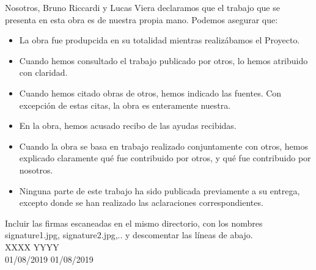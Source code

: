 \documentclass[12pt,a4paper,oneside]{book}
\begin{document}
Nosotros, Bruno Riccardi y Lucas Viera declaramos que el trabajo que se presenta en esta obra es de nuestra
propia mano. Podemos asegurar que:
\begin{itemize}
\item La obra fue produpcida en su totalidad mientras realizábamos el Proyecto.
\item Cuando hemos consultado el trabajo publicado por otros, lo hemos atribuido con claridad.
\item Cuando hemos citado obras de otros, hemos indicado las fuentes. Con excepción de estas citas, la obra es enteramente nuestra.
\item En la obra, hemos acusado recibo de las ayudas recibidas.
\item Cuando la obra se basa en trabajo realizado conjuntamente con otros, hemos explicado claramente qué fue contribuido por otros, y qué fue contribuido por nosotros.
\item Ninguna parte de este trabajo ha sido publicada previamente a su entrega, excepto donde se han realizado las aclaraciones correspondientes.
\end{itemize}

 
\vspace{2cm}


\noindent Incluir las firmas escaneadas en el mismo directorio, con los nombres signature1.jpg, signature2.jpg,.. y descomentar las líneas de abajo.\\


XXXX \hfill YYYY \\

01/08/2019 \hfill 01/08/2019



%



\end{document}
